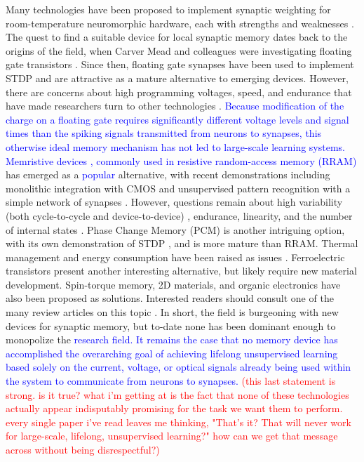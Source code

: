 \documentclass[twocolumn]{article}
\begin{document}
Many technologies have been proposed to implement synaptic weighting for room-temperature neuromorphic hardware, each with strengths and weaknesses \cite{upadhyay2019emerging}. The quest to find a suitable device for local synaptic memory dates back to the origins of the field, when Carver Mead and colleagues were investigating floating gate transistors \cite{diorio1998floating}. Since then, floating gate synapses have been used to implement STDP \cite{ramakrishnan2011floating} and are attractive as a mature alternative to emerging devices. However, there are concerns about high programming voltages, speed, and endurance that have made researchers turn to other technologies \cite{zahoor2020resistive}. \textcolor{blue}{Because modification of the charge on a floating gate requires significantly different voltage levels and signal times than the spiking signals transmitted from neurons to synapses, this otherwise ideal memory mechanism has not led to large-scale learning systems. Memristive devices \cite{stsn2008,yast2012,ab2018}, commonly used in resistive random-access memory (RRAM)} has emerged as a \textcolor{blue}{popular} alternative, with recent demonstrations including monolithic integration with CMOS \cite{yin2019monolithically} and unsupervised pattern recognition with a simple network of synapses \cite{ielmini2018brain}. However, questions remain about high variability (both cycle-to-cycle and device-to-device) \cite{dalgaty2019hybrid}, endurance, linearity, and the number of internal states \cite{zahoor2020resistive}. Phase Change Memory (PCM) is another intriguing option, with its own demonstration of STDP \cite{ambrogio2016unsupervised}, and is more mature than RRAM. Thermal management and energy consumption have been raised as issues \cite{upadhyay2019emerging, zahoor2020resistive}. Ferroelectric transistors present another interesting alternative, but likely require new material development. Spin-torque memory, 2D materials, and organic electronics have also been proposed as solutions. Interested readers should consult one of the many review articles on this topic \cite{kim2018recent, upadhyay2019emerging, zhang2020brain}. In short, the field is burgeoning with new devices for synaptic memory, but to-date none has been dominant enough to monopolize the \textcolor{blue}{research field. It remains the case that no memory device has accomplished the overarching goal of achieving lifelong unsupervised learning based solely on the current, voltage, or optical signals already being used within the system to communicate from neurons to synapses.} \textcolor{red}{(this last statement is strong. is it true? what i'm getting at is the fact that none of these technologies actually appear indisputably promising for the task we want them to perform. every single paper i've read leaves me thinking, "That's it? That will never work for large-scale, lifelong, unsupervised learning?" how can we get that message across without being disrespectful?)} 
\end{document}
